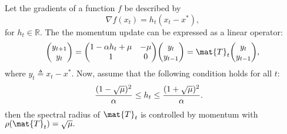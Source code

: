 \begin{corollary}
	Let the gradients of a function $f$ be described by
\begin{equation}
	\nabla f(x_t) = h_t (x_t - x^*),
\end{equation}
for $h_t \in \mathbb{R}$.
The the momentum update can be expressed as a linear operator:
\begin{align}
{\begin{pmatrix}
y_{t+1}\\
y_t \\
\end{pmatrix}}
=
{\begin{pmatrix}
1-\alpha h_t + \mu & - \mu\\
1 & 0 \\
\end{pmatrix}}
{\begin{pmatrix}
y_t \\
y_{t-1} \\
\end{pmatrix}}
=\mat{T}_t
{\begin{pmatrix}
y_t \\
y_{t-1} \\
\end{pmatrix}},
\end{align}
where $y_t\triangleq x_t - x^*$.
Now, assume that the following condition holds for all $t$:
\begin{align}
{(1-\sqrt{\mu})^2\over \alpha} &\leq h_t \leq {(1+\sqrt{\mu})^2\over \alpha}.
\label{equ:control_condition_scalar}
\end{align}
then the spectral radius of $\mat{T}_t$ is controlled by momentum with
$	\rho(\mat{T}_t) = \sqrt{\mu}.$
\end{corollary}


